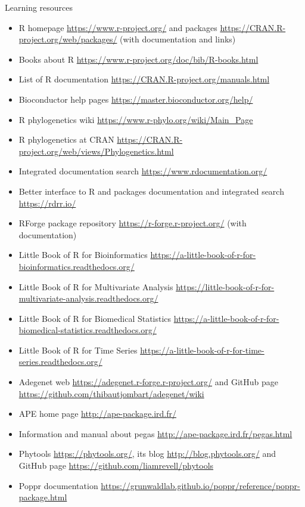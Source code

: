 \documentclass[compress, ucs, xelatex, 11pt, xcolor=svgnames, aspectratio=169,
	hyperref={
		bookmarks=true,
		unicode=true,
		colorlinks=true,
		pdftitle={Molecular data in R},
		plainpages=false,
		pdfauthor={Vojtech Zeisek},
		pdfsubject={Course about phylogeny and evolution in R},
		pdfcreator={XeLaTeX},
		pdfkeywords={R, evolution, phylogeny, molecular data},
		linkcolor=Crimson, %
		anchorcolor=Magenta, %
		citecolor=Magenta, %
		filecolor=Magenta, %
		menucolor=Magenta, %
		urlcolor=DodgerBlue, %
		pdftex},
	url={hyphens, lowtilde} %
	]{beamer}
\begin{document}
\begin{frame}[allowframebreaks]{Learning resources}
	\begin{itemize}
		\item R homepage \url{https://www.r-project.org/} and packages \url{https://CRAN.R-project.org/web/packages/} (with documentation and links)
		\item Books about R \url{https://www.r-project.org/doc/bib/R-books.html}
		\item List of R documentation \url{https://CRAN.R-project.org/manuals.html}
		\item Bioconductor help pages \url{https://master.bioconductor.org/help/}
		\item R phylogenetics wiki \url{https://www.r-phylo.org/wiki/Main_Page}
		\item R phylogenetics at CRAN \url{https://CRAN.R-project.org/web/views/Phylogenetics.html}
		\item Integrated documentation search \url{https://www.rdocumentation.org/}
		\item Better interface to R and packages documentation and integrated search \url{https://rdrr.io/}
		\item RForge package repository \url{https://r-forge.r-project.org/} (with documentation)
		\item Little Book of R for Bioinformatics \url{https://a-little-book-of-r-for-bioinformatics.readthedocs.org/}
		\item Little Book of R for Multivariate Analysis \url{https://little-book-of-r-for-multivariate-analysis.readthedocs.org/}
		\item Little Book of R for Biomedical Statistics \url{https://a-little-book-of-r-for-biomedical-statistics.readthedocs.org/}
		\item Little Book of R for Time Series \url{https://a-little-book-of-r-for-time-series.readthedocs.org/}
		\item Adegenet web \url{https://adegenet.r-forge.r-project.org/} and GitHub page \url{https://github.com/thibautjombart/adegenet/wiki}
		\item APE home page \url{http://ape-package.ird.fr/}
		\item Information and manual about pegas \url{http://ape-package.ird.fr/pegas.html}
		\item Phytools \url{https://phytools.org/}, its blog \url{http://blog.phytools.org/} and GitHub page \url{https://github.com/liamrevell/phytools}
		\item Poppr documentation \url{https://grunwaldlab.github.io/poppr/reference/poppr-package.html}

\end{itemize}
\end{frame}
\end{document}
